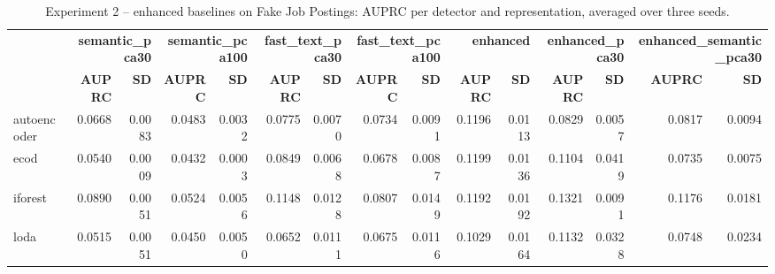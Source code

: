 \begin{table}
\centering
\caption{Experiment 2 -- enhanced baselines on Fake Job Postings: AUPRC per detector and representation, averaged over three seeds.}
\label{tab:exp2_fake_jobs}
\begin{tabular}{lrrrrrrrrrrrrrr}
\toprule
 & \multicolumn{2}{r}{\bfseries semantic\_pca30} & \multicolumn{2}{r}{\bfseries semantic\_pca100} & \multicolumn{2}{r}{\bfseries fast\_text\_pca30} & \multicolumn{2}{r}{\bfseries fast\_text\_pca100} & \multicolumn{2}{r}{\bfseries enhanced} & \multicolumn{2}{r}{\bfseries enhanced\_pca30} & \multicolumn{2}{r}{\bfseries enhanced\_semantic\_pca30} \\
 & \bfseries AUPRC & \bfseries SD & \bfseries AUPRC & \bfseries SD & \bfseries AUPRC & \bfseries SD & \bfseries AUPRC & \bfseries SD & \bfseries AUPRC & \bfseries SD & \bfseries AUPRC & \bfseries SD & \bfseries AUPRC & \bfseries SD \\
\midrule
autoencoder & 0.0668 & 0.0083 & 0.0483 & 0.0032 & 0.0775 & 0.0070 & 0.0734 & 0.0091 & 0.1196 & 0.0113 & 0.0829 & 0.0057 & 0.0817 & 0.0094 \\
ecod & 0.0540 & 0.0009 & 0.0432 & 0.0003 & 0.0849 & 0.0068 & 0.0678 & 0.0087 & 0.1199 & 0.0136 & 0.1104 & 0.0419 & 0.0735 & 0.0075 \\
iforest & 0.0890 & 0.0051 & 0.0524 & 0.0056 & 0.1148 & 0.0128 & 0.0807 & 0.0149 & 0.1192 & 0.0192 & 0.1321 & 0.0091 & 0.1176 & 0.0181 \\
loda & 0.0515 & 0.0051 & 0.0450 & 0.0050 & 0.0652 & 0.0111 & 0.0675 & 0.0116 & 0.1029 & 0.0164 & 0.1132 & 0.0328 & 0.0748 & 0.0234 \\
\bottomrule
\end{tabular}
\end{table}
